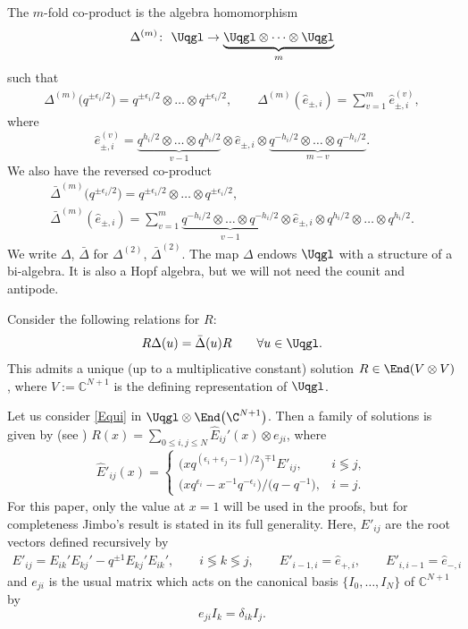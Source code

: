 The $m$-fold co-product is the algebra homomorphism \[\Delta^{(m)}\colon \ \Uqgl \rightarrow \underbrace{\Uqgl \otimes \dots \otimes \Uqgl}_{m} \]
such that \begin{gather}
 \Delta^{(m)}\big (q^{\pm \epsilon_i/2}\big)= q^{\pm \epsilon_i/2} \otimes \dots \otimes q^{\pm \epsilon_i/2},\qquad
 \Delta^{(m)} (\hat{e}_{\pm ,i} ) =\sum_{v=1}^{m} \hat{e}^{(v)}_{\pm ,i} ,\label{qerel}
\end{gather}
where
\[
\hat{e}^{(v)}_{\pm ,i} = \underbrace{q^{h_i/2} \otimes \dots \otimes q^{h_i/2}}_{v-1} \otimes \hat{e}_{\pm ,i} \otimes \underbrace{ q^{-h_i/2} \otimes \dots \otimes q^{-h_i/2}}_{m-v}.
\]
 We also have the reversed co-product
 \begin{gather*}
 \bar{\Delta}^{(m)} \big(q^{\pm \epsilon_i/2}\big)= q^{\pm \epsilon_i/2} \otimes \dots \otimes q^{\pm \epsilon_i/2}, \\
 \bar{\Delta}^{(m)} (\hat{e}_{\pm, i})= \sum_{v=1}^{m} \underbrace{q^{-h_i/2} \otimes \dots \otimes q^{-h_i/2}}_{v-1} \otimes \hat{e}_{\pm, i} \otimes q^{h_i/2} \otimes \dots \otimes q^{h_i/2}.
 \end{gather*}
We write $\Delta$, $\bar{\Delta}$ for $\Delta^{(2)}$, $\bar{\Delta}^{(2)}$. The map $ \Delta $ endows $ \Uqgl $ with a structure of a bi-algebra. It is also a Hopf algebra, but we will not need the counit and antipode.

Consider the following relations for $R$:
\begin{gather}
 R \Delta(u) = \bar{\Delta}(u) R \qquad \forall u\in \Uqgl. \label{Equi}
\end{gather}
 This admits a unique (up to a multiplicative constant) solution
$ R \in \End (V\otimes V) $, where $ V:=\mathbb{C}^{N+1} $ is the defining representation of $ \Uqgl $.

 Let us consider \eqref{Equi} in $ \Uqgl \otimes \End \big(\C^{N+1}\big) $. Then a family of solutions is given by (see \cite{Jimbo1986}) $R(x)= \sum_{0 \leq i,j \leq N} \hat{E}_{ij}'(x) \otimes e_{ji} $, where
 \begin{gather*} %
 \hat{E}'_{ij}(x) = \begin{cases}
 \big(x q^{(\epsilon_i+\epsilon_j-1)/2}\big)^{\mp 1} {E}'_{ij} , & i \lessgtr j,\\
 \big(xq^{\epsilon_i}- x^{-1}q^{- \epsilon_i}\big)/\big(q-q^{-1}\big), & i=j.
 \end{cases}
 \end{gather*}
 For this paper, only the value at $x=1$ will be used in the proofs, but for completeness Jimbo's result is stated in its full generality. Here, $ E'_{ij} $ are the root vectors defined recursively by
 \begin{gather*}
E'_{ij}= E_{ik}'E_{kj}' -q^{\pm 1} E_{kj}'E_{ik}',\qquad i \lessgtr k \lessgtr j, \qquad E'_{i-1,i} = \hat{e}_{+,i}, \qquad E'_{i,i-1} = \hat{e}_{-,i}
\end{gather*}
and $e_{ji}$ is the usual matrix which acts on the canonical basis $\{I_0,\dots,I_N\}$ of $\mathbb{C}^{N+1}$ by
\[
e_{ji}I_k = \delta_{ik} I_j.
\]

